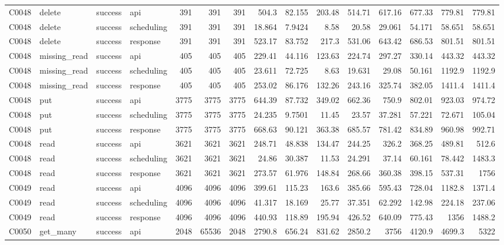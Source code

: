 \begin{landscape}
\begin{longtable}{llllrrrrrrrrrrr}
C0048 & delete & success & api & 391 & 391 & 391 & 504.3 & 82.155 & 203.48 & 514.71 & 617.16 & 677.33 & 779.81 & 779.81\\
C0048 & delete & success & scheduling & 391 & 391 & 391 & 18.864 & 7.9424 & 8.58 & 20.58 & 29.061 & 54.171 & 58.651 & 58.651\\
C0048 & delete & success & response & 391 & 391 & 391 & 523.17 & 83.752 & 217.3 & 531.06 & 643.42 & 686.53 & 801.51 & 801.51\\
C0048 & missing\_\allowbreak{}read & success & api & 405 & 405 & 405 & 229.41 & 44.116 & 123.63 & 224.74 & 297.27 & 330.14 & 443.32 & 443.32\\
C0048 & missing\_\allowbreak{}read & success & scheduling & 405 & 405 & 405 & 23.611 & 72.725 & 8.63 & 19.631 & 29.08 & 50.161 & 1192.9 & 1192.9\\
C0048 & missing\_\allowbreak{}read & success & response & 405 & 405 & 405 & 253.02 & 86.176 & 132.26 & 243.16 & 325.74 & 382.05 & 1411.4 & 1411.4\\
C0048 & put & success & api & 3775 & 3775 & 3775 & 644.39 & 87.732 & 349.02 & 662.36 & 750.9 & 802.01 & 923.03 & 974.72\\
C0048 & put & success & scheduling & 3775 & 3775 & 3775 & 24.235 & 9.7501 & 11.45 & 23.57 & 37.281 & 57.221 & 72.671 & 105.04\\
C0048 & put & success & response & 3775 & 3775 & 3775 & 668.63 & 90.121 & 363.38 & 685.57 & 781.42 & 834.89 & 960.98 & 992.71\\
C0048 & read & success & api & 3621 & 3621 & 3621 & 248.71 & 48.838 & 134.47 & 244.25 & 326.2 & 368.25 & 489.81 & 512.6\\
C0048 & read & success & scheduling & 3621 & 3621 & 3621 & 24.86 & 30.387 & 11.53 & 24.291 & 37.14 & 60.161 & 78.442 & 1483.3\\
C0048 & read & success & response & 3621 & 3621 & 3621 & 273.57 & 61.976 & 148.84 & 268.66 & 360.38 & 398.15 & 537.31 & 1756\\
C0049 & read & success & api & 4096 & 4096 & 4096 & 399.61 & 115.23 & 163.6 & 385.66 & 595.43 & 728.04 & 1182.8 & 1371.4\\
C0049 & read & success & scheduling & 4096 & 4096 & 4096 & 41.317 & 18.169 & 25.77 & 37.351 & 62.292 & 142.98 & 224.18 & 237.06\\
C0049 & read & success & response & 4096 & 4096 & 4096 & 440.93 & 118.89 & 195.94 & 426.52 & 640.09 & 775.43 & 1356 & 1488.2\\
C0050 & get\_\allowbreak{}many & success & api & 2048 & 65536 & 2048 & 2790.8 & 656.24 & 831.62 & 2850.2 & 3756 & 4120.9 & 4699.3 & 5322\\

\end{longtable}
\end{landscape}
